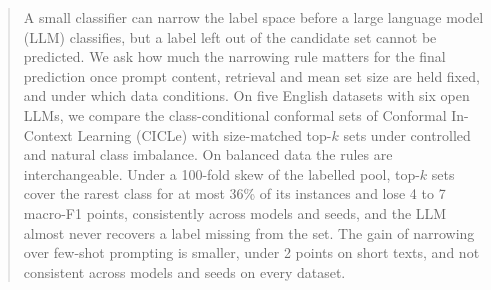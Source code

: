 \begin{abstract}
A small classifier can narrow the label space before a large language model (LLM) classifies, but a label left out of the candidate set cannot be predicted.
We ask how much the narrowing rule matters for the final prediction once prompt content, retrieval and mean set size are held fixed, and under which data conditions.
On five English datasets with six open LLMs, we compare the class-conditional conformal sets of Conformal In-Context Learning (CICLe) with size-matched top-$k$ sets under controlled and natural class imbalance. %
On balanced data the rules are interchangeable.
Under a 100-fold skew of the labelled pool, top-$k$ sets cover the rarest class for at most 36\% of its instances and lose 4 to 7 macro-F1 points, consistently across models and seeds, and the LLM almost never recovers a label missing from the set.
The gain of narrowing over few-shot prompting is smaller, under 2 points on short texts, and not consistent across models and seeds on every dataset.
\end{abstract}

